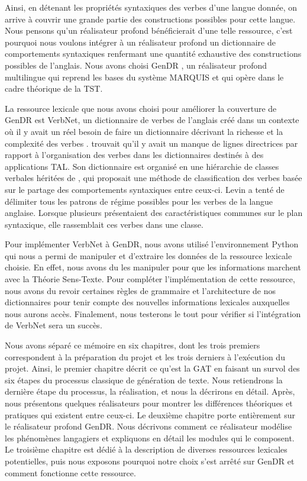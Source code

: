 Ainsi, en détenant les propriétés syntaxiques des verbes d'une langue donnée, on arrive à couvrir une grande partie des constructions possibles pour cette langue. Nous pensons qu'un réalisateur profond bénéficierait d'une telle ressource, c'est pourquoi nous voulons intégrer à un réalisateur profond un dictionnaire de comportements syntaxiques renfermant une quantité exhaustive des constructions possibles de l'anglais. Nous avons choisi GenDR \citep{lareau18,lambrey15,LambreyGECOv1User2016,LambreyImplementationcollocationspour2017,dubinskaite17}, un réalisateur profond multilingue qui reprend les bases du système MARQUIS et qui opère dans le cadre théorique de la \ac{TST}.

La ressource lexicale que nous avons choisi pour améliorer la couverture de GenDR est VerbNet, un dictionnaire de verbes de l'anglais créé dans un contexte où il y avait un réel besoin de faire un dictionnaire décrivant la richesse et la complexité des verbes \citep{KipperClassBasedConstructionVerb2000}. \cite{SchulerVerbnetBroadcoverageComprehensive2005} trouvait qu'il y avait un manque de lignes directrices par rapport à l'organisation des verbes dans les dictionnaires destinés à des applications \ac{TAL}. Son dictionnaire est organisé en une hiérarchie de classes verbales héritées de \cite{verb-classes.levin.1993}, qui proposait une méthode de classification des verbes basée sur le partage des comportements syntaxiques entre ceux-ci. Levin a tenté de délimiter tous les patrons de régime possibles pour les verbes de la langue anglaise. Lorsque plusieurs présentaient des caractéristiques communes sur le plan syntaxique, elle rassemblait ces verbes dans une classe.

Pour implémenter VerbNet à GenDR, nous avons utilisé l'environnement Python qui nous a permi de manipuler et d'extraire les données de la ressource lexicale choisie. En effet, nous avons du les manipuler pour que les informations marchent avec la Théorie Sens-Texte. Pour compléter l'implémentation de cette ressource, nous avons du revoir certaines règles de grammaire et l'architecture de nos dictionnaires pour tenir compte des nouvelles informations lexicales auxquelles nous aurons accès. Finalement, nous testerons le tout pour vérifier si l'intégration de VerbNet sera un succès.

Nous avons séparé ce mémoire en six chapitres, dont les trois premiers correspondent à la préparation du projet et les trois derniers à l'exécution du projet. Ainsi, le premier chapitre décrit ce qu'est la \ac{GAT} en faisant un survol des six étapes du processus classique de génération de texte. Nous retiendrons la dernière étape du processus, la réalisation, et nous la décrirons en détail. Après, nous présentons quelques réalisateurs pour montrer les différences théoriques et pratiques qui existent entre ceux-ci. Le deuxième chapitre porte entièrement sur le réalisateur profond GenDR. Nous décrivons comment ce réalisateur modélise les phénomènes langagiers et expliquons en détail les modules qui le composent. Le troisième chapitre est dédié à la description de diverses ressources lexicales potentielles, puis nous exposons pourquoi notre choix s'est arrêté sur GenDR et comment fonctionne cette ressource.

